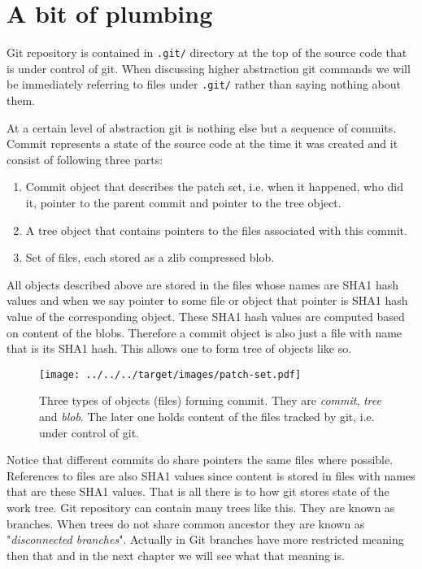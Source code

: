 \documentclass{article}
\theoremstyle{definition}
\begin{document}
        \section{A bit of plumbing}
        Git repository is contained in \texttt{.git/} directory at the top of the source code that is under control of git. 
        When discussing higher abstraction git commands we will be immediately referring to files under \texttt{.git/} rather
        than saying nothing about them.

        At a certain level of abstraction git is nothing else but a sequence of commits. Commit represents a state of the
        source code at the time it was created and it consist of following three parts:
        \begin{enumerate}
            \item Commit object that describes the patch set, i.e. when it happened, who did it, pointer to the parent commit and pointer to the tree object.
            \item A tree object that contains pointers to the files associated with this commit.
            \item Set of files, each stored as a zlib compressed blob.
        \end{enumerate}
        All objects described above are stored in the files whose names are SHA1 hash values and when we say pointer to some
        file or object that pointer is SHA1 hash value of the corresponding object. These SHA1 hash values are computed based
        on content of the blobs. Therefore a commit object is also just a file with name that is its SHA1 hash. This allows one
        to form tree of objects like so.

        \begin{figure}[h]
        \centering
        \texttt{[image: ../../../target/images/patch-set.pdf]}
        \label{fig:patch-set}
        \caption{Three types of objects (files) forming commit. They are {\em commit}, {\em tree} and {\em blob}. The later
          one holds content of the files tracked by git, i.e. under control of git.}
        \end{figure}

        \noindent Notice that different commits do share pointers the same files where possible. References to files are
        also SHA1 values since content is stored in files with names that are these SHA1 values. That is all there is to how
        git stores state of the work tree. Git repository can contain many trees like this. They are known as branches. When
        trees do not share common ancestor they are known as "{\em disconnected branches}". Actually in Git branches have
        more restricted meaning then that and in the next chapter we will see what that meaning is.
\end{document}
